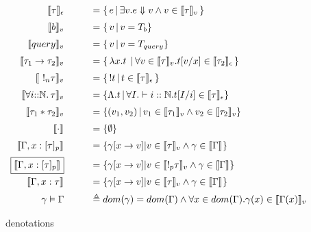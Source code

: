 \begin{figure*}[h]
$$
\begin{array}{rcl}
      \llbracket {\tau} \rrbracket_{\epsilon}  &\quad &  = \{ \, e \, | \, \exists v. e \Downarrow v \land v \in   \llbracket {\tau} \rrbracket_{v} \,  \}  \\[2mm]
      \llbracket {b} \rrbracket_{v} &\quad &  = \{ \,  v  \, | \, v = T_b \}  \\[2mm]
      \llbracket {query} \rrbracket_{v} &\quad &  = \{ \,  v \, |  \, v = T_{query} \}  \\[2mm]
      \llbracket {\tau_1 \rightarrow \tau_2} \rrbracket_{v} & \quad & = \{\, \mathrel { \lambda {x} . {t} } \, | \, \forall v \in\llbracket {\tau} \rrbracket_{v}. t[v/x] \in \llbracket {\tau_2} \rrbracket_{\epsilon} \, \} \\[2mm]
      \llbracket { \ !_n \tau} \rrbracket_{v} & \quad & = \{\, !t \, | \, t \in \llbracket {\tau} \rrbracket_{\epsilon} \, \} \\[2mm]
      \llbracket {\forall i{::}\mathbb{N}.\,{\tau}} \rrbracket_{v}  & \quad & = \{  \Lambda. t \, | \, \forall I. \vdash i :: \mathbb{N}. t[I/i] \in \llbracket {\tau} \rrbracket_{\epsilon}   \}  \\[2mm]
      \llbracket {\tau_1 * \tau_2} \rrbracket_{v}  & \quad & = \{  (v_1, v_2) \, | \, v_1 \in \llbracket {\tau_1} \rrbracket_{v} \land v_2 \in \llbracket {\tau_2} \rrbracket_{v}     \} \\[2mm]
      \llbracket {\cdot} \rrbracket_{} &\quad & = \{ \emptyset \} \\[2mm]
      \llbracket {\Gamma, x : [\tau]_p} \rrbracket_{} & \quad & = \{ \gamma[x \rightarrow v] | v \in \llbracket {\tau} \rrbracket_{v} \land \gamma \in \llbracket {\Gamma} \rrbracket_{}   \}  \\ [2mm]
      \boxed{\llbracket {\Gamma, x : [\tau]_p} \rrbracket_{}}  & \quad & = \{ \gamma[x \rightarrow v] | v \in \llbracket {!_p \tau} \rrbracket_{v}  \land \gamma \in \llbracket {\Gamma} \rrbracket_{}   \}  \\ [2mm]
      \llbracket {\Gamma, x : \tau} \rrbracket_{} & \quad & = \{ \gamma[x \rightarrow v] | v \in \llbracket {\tau} \rrbracket_{v} \land \gamma \in \llbracket {\Gamma} \rrbracket_{}   \}  \\ [2mm]
      \gamma \vDash \Gamma &\quad & \triangleq dom(\gamma) = dom(\Gamma) \land \forall x \in dom(\Gamma). \gamma(x) \in \llbracket {\Gamma(x)} \rrbracket_{v}
\end{array}
$$
\caption{denotations}
\end{figure*}


	
